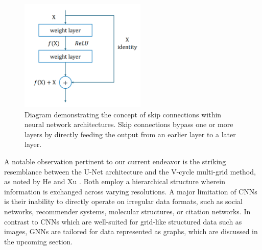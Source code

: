 \begin{figure}[ht]
    \centering
    \includegraphics[width=6cm]{images/Theory-DL/Skip.png}
    \caption{Diagram demonstrating the concept of skip connections within neural network architectures. Skip connections bypass one or more layers by directly feeding the output from an earlier layer to a later layer.} 
    \label{fig:Skip}
\end{figure}
A notable observation pertinent to our current endeavor is the striking resemblance between the U-Net architecture and the V-cycle multi-grid method, as noted by He and Xu \cite{HeXu2019}. Both employ a hierarchical structure wherein information is exchanged across varying resolutions.
A major limitation of CNNs is their inability to directly operate on irregular data formats, such as social networks, recommender systems, molecular structures, or citation networks. In contrast to CNNs which are well-suited for grid-like structured data such as images, GNNs are tailored for data represented as graphs, which are discussed in the upcoming section.

